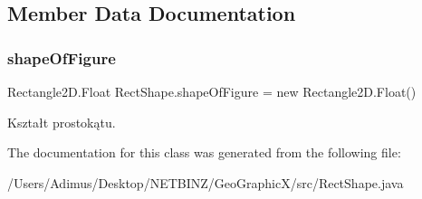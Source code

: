 \subsection{Member Data Documentation}
\mbox{\label{class_rect_shape_a2fa9784d223de713a36b232bcf28e3bc}} 
\subsubsection{shape\+Of\+Figure}
{\footnotesize\ttfamily Rectangle2\+D.\+Float Rect\+Shape.\+shape\+Of\+Figure = new Rectangle2\+D.\+Float()\hspace{0.3cm}{\ttfamily [protected]}}

Kształt prostokątu. 

The documentation for this class was generated from the following file\+:\begin{DoxyCompactItemize}
\item 
/\+Users/\+Adimus/\+Desktop/\+N\+E\+T\+B\+I\+N\+Z/\+Geo\+Graphic\+X/src/Rect\+Shape.\+java\end{DoxyCompactItemize}
